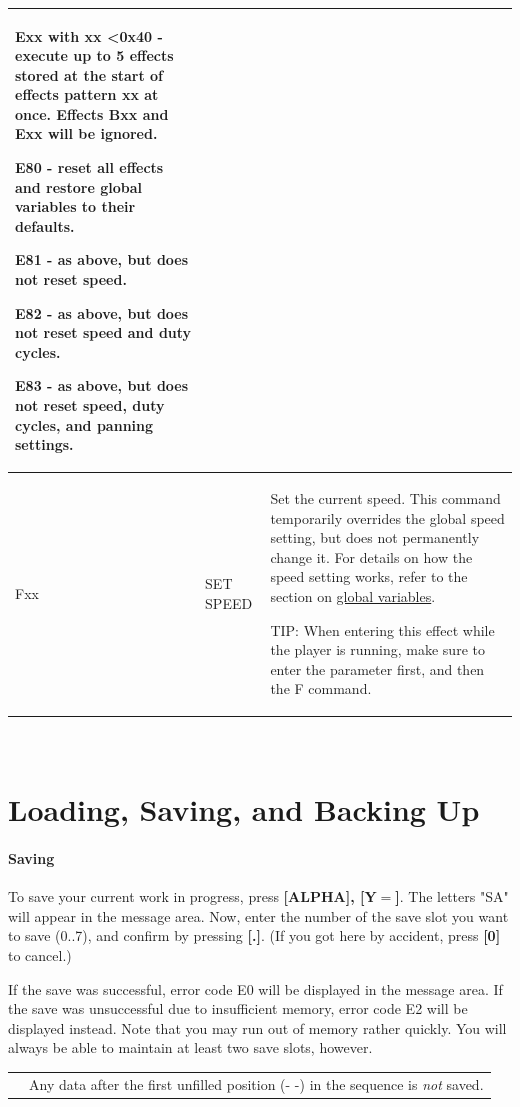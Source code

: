 \documentclass[12pt]{report}	%
\newcommand*{\TakeFourierOrnament}[1]{{%
\fontencoding{U}\fontfamily{futs}\selectfont\char#1}}
\newcommand*{\danger}{\TakeFourierOrnament{66}}
\begin{document}
\begin{longtable}{p{} p{} p{}}
Exx with xx \textless\space0x40 - execute up to 5 effects stored at the start of effects pattern xx at once. Effects Bxx and Exx will be ignored.

E80 - reset all effects and restore global variables to their defaults.

E81 - as above, but does not reset speed.

E82 - as above, but does not reset speed and duty cycles.

E83 - as above, but does not reset speed, duty cycles, and panning settings. \\
\hline
Fxx & SET SPEED & Set the current speed. This command temporarily overrides the global speed setting, but does not permanently change it. For details on how the speed setting works, refer to the section on \hyperref[sec:globalvars]{global variables}.

TIP: When entering this effect while the player is running, make sure to enter the parameter first, and then the F command. \\
\hline
\end{longtable} ~\\


\section{Loading, Saving, and Backing Up}
\paragraph{Saving} To save your current work in progress, press \textbf{[ALPHA], [Y$\bm{=}$]}. The letters "SA" will appear in the message area. Now, enter the number of the save slot you want to save (0..7), and confirm by pressing \textbf{[.]}. (If you got here by accident, press \textbf{[0]} to cancel.)

If the save was successful, error code E0 will be displayed in the message area. If the save was unsuccessful due to insufficient memory, error code E2 will be displayed instead. Note that you may run out of memory rather quickly. You will always be able to maintain at least two save slots, however. \newline

\begin{tabularx}{\textwidth}{m{} X}
{\textcolor{red}{\newline\Huge\danger}} & Any data after the first unfilled position (- -) in the sequence is \emph{not} saved. \\
\end{tabularx} ~\\
\end{document}
